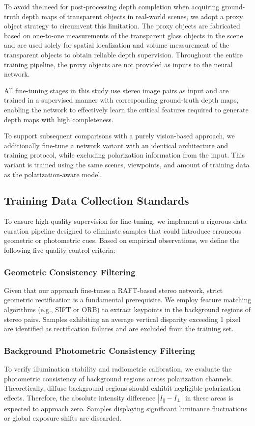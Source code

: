 \documentclass[letterpaper, 10 pt, conference]{ieeeconf}  %
\begin{document}
To avoid the need for post-processing depth completion when acquiring ground-truth depth maps of transparent objects in real-world scenes, we adopt a proxy object strategy to circumvent this limitation.
The proxy objects are fabricated based on one-to-one measurements of the transparent glass objects in the scene and are used solely for spatial localization and volume measurement of the transparent objects to obtain reliable depth supervision.
Throughout the entire training pipeline, the proxy objects are not provided as inputs to the neural network.

All fine-tuning stages in this study use stereo image pairs as input and are trained in a supervised manner with corresponding ground-truth depth maps, enabling the network to effectively learn the critical features required to generate depth maps with high completeness.

To support subsequent comparisons with a purely vision-based approach, we additionally fine-tune a network variant with an identical architecture and training protocol, while excluding polarization information from the input.
This variant is trained using the same scenes, viewpoints, and amount of training data as the polarization-aware model.
\subsection{\textbf{Training Data Collection Standards}}

To ensure high-quality supervision for fine-tuning, we implement a rigorous data curation pipeline designed to eliminate samples that could introduce erroneous geometric or photometric cues. Based on empirical observations, we define the following five quality control criteria:

\subsubsection{\textbf{Geometric Consistency Filtering}}
Given that our approach fine-tunes a RAFT-based stereo network, strict geometric rectification is a fundamental prerequisite. We employ feature matching algorithms (e.g., SIFT or ORB) to extract keypoints in the background regions of stereo pairs. Samples exhibiting an average vertical disparity exceeding 1 pixel are identified as rectification failures and are excluded from the training set.

\subsubsection{\textbf{Background Photometric Consistency Filtering}}
To verify illumination stability and radiometric calibration, we evaluate the photometric consistency of background regions across polarization channels. Theoretically, diffuse background regions should exhibit negligible polarization effects. Therefore, the absolute intensity difference $|I_{\parallel} - I_{\perp}|$ in these areas is expected to approach zero. Samples displaying significant luminance fluctuations or global exposure shifts are discarded.
\end{document}
